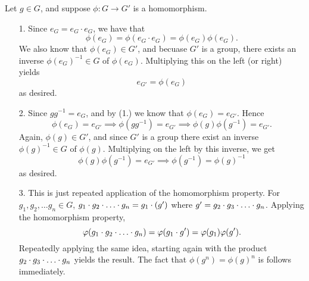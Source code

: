     \begin{prf}
        Let $g \in G$, and suppose $\phi: G \to G'$ is a
        homomorphism. 
        
        \begin{itemize}
            \item[1.] Since $e_G = e_G \cdot e_G$, we have that 
            \[
                \phi(e_G) = \phi(e_G \cdot e_G) = \phi(e_G)\phi(e_G).
            \] 
            We also know that $\phi(e_G) \in G'$, and becuase $G'$ is a group,
            there exists an inverse $\phi(e_G)^{-1} \in G$ of
            $\phi(e_G)$. Multiplying this on the left (or right)
            yields
            \[
                e_{G'} = \phi(e_G)  
            \]
            as desired.
            \item[2.] Since $gg^{-1} = e_G$, and by (1.) we know that
            $\phi(e_G) = e_{G'}$. Hence 
            \[
                \phi(e_G) = e_{G'} \implies \phi(gg^{-1}) = e_{G'} 
                \implies \phi(g)\phi(g^{-1}) = e_{G'}.
            \]
            Again, $\phi(g) \in G'$, and since $G'$ is a group there
            exist an inverse $\phi(g)^{-1} \in G$ of $\phi(g)$.
            Multiplying on the left by this inverse, we get 
            \[
                \phi(g)\phi(g^{-1}) = e_{G'} \implies \phi(g^{-1}) = \phi(g)^{-1}
            \]
            as desired.

            \item[3.] This is just repeated application of the
            homomorphism property. 
            For $g_1, g_2, \dots g_n \in G$, $g_1 \cdot
            g_2 \cdot \hspace{0.01mm} \dots \hspace{0.01mm} \cdot g_n = g_1 \cdot (g')$ 
            where $g' = g_2
            \cdot g_3 \cdot \hspace{0.01mm} \dots \hspace{0.01mm} \cdot g_n$. Applying the
            homomorphism property, 
            \[
                \phi(g_1 \cdot g_2 \cdot \hspace{0.01mm} \dots \hspace{0.01mm} \cdot g_n) = \phi(g_1 \cdot g') = \phi(g_1) \phi(g').
            \]
            Repeatedly applying the same idea, starting again with the
            product $g_2 \cdot g_3 \cdot \hspace{0.01mm} \dots
            \hspace{0.01mm} \cdot g_n$ yields the result. The fact
            that $\phi(g^n) = \phi(g)^n$ is follows immediately.
        \end{itemize}
    \end{prf}

